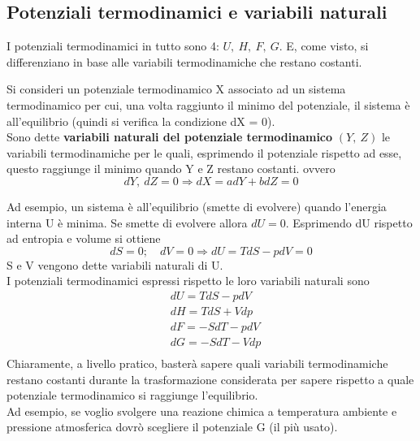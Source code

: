 \documentclass[
10pt, %
a4paper, %
oneside, %
headinclude,footinclude, %
BCOR5mm, %
]{scrartcl}
\begin{document}
\subsection{Potenziali termodinamici e variabili naturali}\label{sec:variabili_naturali}
I potenziali termodinamici in tutto sono 4: \(U,\ H,\ F,\ G\). E, come visto, si differenziano in base alle variabili termodinamiche che restano costanti. 
\begin{definition}
	Si consideri un potenziale termodinamico X associato ad un sistema termodinamico per cui, una volta raggiunto il minimo del potenziale, il sistema è all'equilibrio (quindi si verifica la condizione dX = 0).\\
	Sono dette \textbf{variabili naturali del potenziale termodinamico} \((Y,\ Z)\) le variabili termodinamiche per le quali, esprimendo il potenziale rispetto ad esse, questo raggiunge il minimo quando Y e Z restano costanti. ovvero
	\[dY,\ dZ = 0 \Rightarrow dX = a dY + b dZ = 0 \]
\end{definition}
Ad esempio, un sistema è all'equilibrio (smette di evolvere) quando l'energia interna U è minima. Se smette di evolvere allora \(dU = 0\). Esprimendo dU rispetto ad entropia e volume si ottiene
\[ dS = 0;\quad dV = 0 \Rightarrow dU = TdS - pdV = 0\]
S e V vengono dette variabili naturali di U.\\
I potenziali termodinamici espressi rispetto le loro variabili naturali sono
\begin{align*}
	&dU = TdS - pdV\\
	&dH = TdS + Vdp\\
	&dF = - S dT-pdV\\
	&dG = -SdT - Vdp\\
\end{align*}
Chiaramente, a livello pratico, basterà sapere quali variabili termodinamiche restano costanti durante la trasformazione considerata per sapere rispetto a quale potenziale termodinamico si raggiunge l'equilibrio.\\
Ad esempio, se voglio svolgere una reazione chimica a temperatura ambiente e pressione atmosferica  dovrò scegliere il potenziale G (il più usato).
\end{document}
